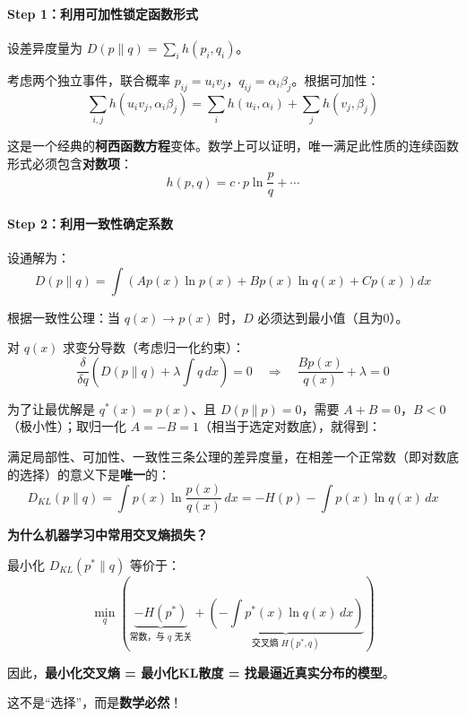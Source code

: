 \paragraph{Step 1：利用可加性锁定函数形式}

设差异度量为 $D(p\|q) = \sum_i h(p_i, q_i)$。

考虑两个独立事件，联合概率 $p_{ij} = u_i v_j$，$q_{ij} = \alpha_i \beta_j$。根据可加性：
\[
\sum_{i,j} h(u_i v_j, \alpha_i \beta_j) = \sum_i h(u_i, \alpha_i) + \sum_j h(v_j, \beta_j)
\]

这是一个经典的\textbf{柯西函数方程}变体。数学上可以证明，唯一满足此性质的连续函数形式必须包含\textbf{对数项}：
\[
h(p, q) = c \cdot p \ln \frac{p}{q} + \cdots
\]

\paragraph{Step 2：利用一致性确定系数}

设通解为：
\[
D(p\|q) = \int \left( A p(x) \ln p(x) + B p(x) \ln q(x) + C p(x) \right) dx
\]

根据一致性公理：当 $q(x) \to p(x)$ 时，$D$ 必须达到最小值（且为0）。

对 $q(x)$ 求变分导数（考虑归一化约束）：
\[
\frac{\delta}{\delta q} \left( D(p\|q) + \lambda \int q \, dx \right) = 0
\quad \Rightarrow \quad
\frac{B p(x)}{q(x)} + \lambda = 0
\]

为了让最优解是 $q^*(x) = p(x)$、且 $D(p\|p) = 0$，需要 $A + B = 0$，$B < 0$（极小性）；取归一化 $A = -B = 1$（相当于选定对数底），就得到：

\begin{keytheorem}[title=KL散度的唯一性]
满足局部性、可加性、一致性三条公理的差异度量，在相差一个正常数（即对数底的选择）的意义下是\textbf{唯一}的：
\begin{equation}
\boxed{D_{KL}(p \| q) = \int p(x) \ln \frac{p(x)}{q(x)} \, dx = -H(p) - \int p(x) \ln q(x) \, dx}
\end{equation}
\end{keytheorem}

\begin{insightbox}
\textbf{为什么机器学习中常用交叉熵损失？}

最小化 $D_{KL}(p^* \| q)$ 等价于：
\[
\min_q \left( \underbrace{-H(p^*)}_{\text{常数，与 }q\text{ 无关}} + \underbrace{\left(-\int p^*(x) \ln q(x) \, dx\right)}_{\text{交叉熵 }H(p^*, q)} \right)
\]

因此，\textbf{最小化交叉熵 = 最小化KL散度 = 找最逼近真实分布的模型}。

这不是“选择”，而是\textbf{数学必然}！
\end{insightbox}

